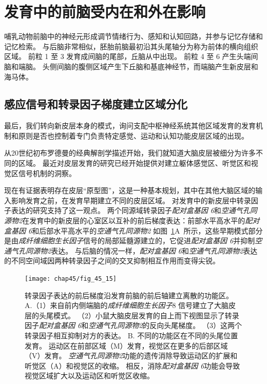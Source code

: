 \section{发育中的前脑受内在和外在影响}

哺乳动物前脑中的神经元形成调节情绪行为、感知和认知回路，并参与记忆存储和记忆检索。
与后脑非常相似，胚胎前脑最初沿其头尾轴分为称为前体的横向组织区域。
前粒 1 至 3 发育成间脑的尾部，丘脑从中出现。
前粒 4 至 6 产生头端间脑和端脑。
头侧间脑的腹侧区域产生下丘脑和基底神经节，而端脑产生新皮层和海马体。



\subsection{感应信号和转录因子梯度建立区域分化}

最后，我们转向新皮层本身的模式，询问支配中枢神经系统其他区域发育的发育机制和原则是否也控制着专门负责特定感觉、运动和认知功能皮层区域的出现。


从20世纪初布罗德曼的经典解剖学描述开始，我们就知道大脑皮层被细分为许多不同的区域。
最近对皮层发育的研究已经开始提供对建立躯体感觉区、听觉区和视觉区信号机制的洞察。


现在有证据表明存在皮层“原型图”，这是一种基本规划，其中在其他大脑区域的输入影响发育之前，在发育早期建立不同的皮层区域。
对发育中的新皮层中转录因子表达的研究支持了这一观点。
两个同源域转录因子\textit{配对盒基因 6}和\textit{空通气孔同源物2}在发育中的新皮层的心室区以互补的前后梯度表达：前部水平高水平的\textit{配对盒基因 6}和后部水平高水平的\textit{空通气孔同源物2}
如图~\ref{fig:45_15}A~所示，这些早期模式部分是由\textit{成纤维细胞生长因子}信号的局部延髓源建立的，它促进\textit{配对盒基因 6}并抑制\textit{空通气孔同源物2}表达。
与后脑的情况一样，\textit{配对盒基因 6}和\textit{空通气孔同源物2}表达的不同空间域因两种转录因子之间的交叉抑制相互作用而变得尖锐。


\begin{figure}[htbp]
	\centering
	\texttt{[image: chap45/fig\_45\_15]}
	\caption{转录因子表达的前后梯度沿发育前脑的前后轴建立离散的功能区\cite{hamasaki2004emx2}。
		A.（1）来自前内侧端脑的\textit{成纤维细胞生长因子}8 信号建立了大脑皮层的头尾模式。
		（2）小鼠大脑皮层发育的自上而下视图显示了转录因子\textit{配对盒基因 6}和\textit{空通气孔同源物2}的反向头尾梯度。
		（3）这两个转录因子相互抑制对方的表达。
		B. 不同的功能区在不同的头尾位置发育。
		运动区在前部区域（M）发育，视觉区在更多的后部区域（V）发育。
		\textit{空通气孔同源物2}功能的遗传消除导致运动区的扩展和听觉区（A）和视觉区的收缩。
		相反，消除\textit{配对盒基因 6}功能会导致视觉区域扩大以及运动区和听觉区收缩。}
	\label{fig:45_15}
\end{figure}



